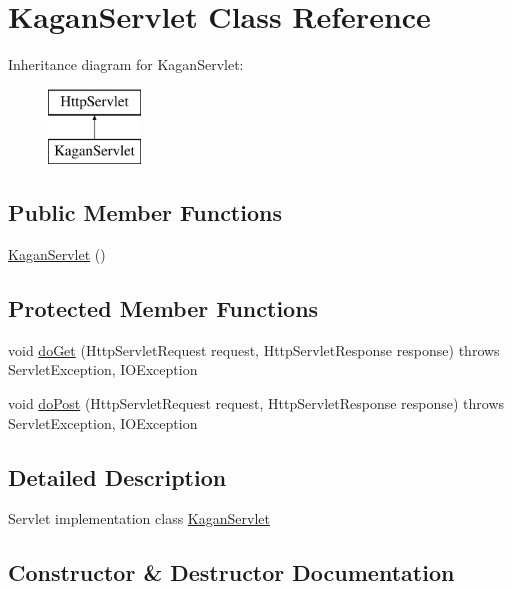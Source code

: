 \hypertarget{class_kagan_servlet}{}\section{Kagan\+Servlet Class Reference}
\label{class_kagan_servlet}
Inheritance diagram for Kagan\+Servlet\+:\begin{figure}[H]
\begin{center}
\leavevmode
\includegraphics[height=2.000000cm]{class_kagan_servlet}
\end{center}
\end{figure}
\subsection*{Public Member Functions}
\begin{DoxyCompactItemize}
\item 
\hyperlink{class_kagan_servlet_aa9733d9af94d7f9e4fd26e7d4dddca59}{Kagan\+Servlet} ()
\end{DoxyCompactItemize}
\subsection*{Protected Member Functions}
\begin{DoxyCompactItemize}
\item 
void \hyperlink{class_kagan_servlet_a069884122c17967444f59c24436e0713}{do\+Get} (Http\+Servlet\+Request request, Http\+Servlet\+Response response)  throws Servlet\+Exception, I\+O\+Exception 
\item 
void \hyperlink{class_kagan_servlet_a557149953b3b57dc5a405506e8349609}{do\+Post} (Http\+Servlet\+Request request, Http\+Servlet\+Response response)  throws Servlet\+Exception, I\+O\+Exception 
\end{DoxyCompactItemize}


\subsection{Detailed Description}
Servlet implementation class \hyperlink{class_kagan_servlet}{Kagan\+Servlet} 

\subsection{Constructor \& Destructor Documentation}
\hypertarget{class_kagan_servlet_aa9733d9af94d7f9e4fd26e7d4dddca59}{}

